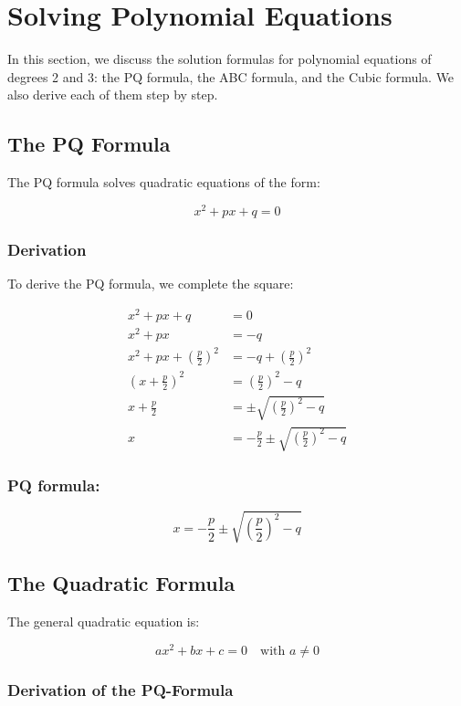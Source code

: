 \newpage
\section{Solving Polynomial Equations}

In this section, we discuss the solution formulas for polynomial equations of degrees 2 and 3: the PQ formula, the ABC formula, and the Cubic formula. We also derive each of them step by step.

\subsection{The PQ Formula}

The PQ formula solves quadratic equations of the form:

\[
x^2 + px + q = 0
\]

\subsubsection{Derivation}

To derive the PQ formula, we complete the square:

\begin{align*}
x^2 + px + q &= 0 \\
x^2 + px &= -q \\
x^2 + px + {\left(\frac{p}{2}\right)}^2 &= -q + {\left(\frac{p}{2}\right)}^2 \\
{\left(x + \frac{p}{2}\right)}^2 &= {\left(\frac{p}{2}\right)}^2 - q \\
x + \frac{p}{2} &= \pm \sqrt{{\left(\frac{p}{2}\right)}^2 - q} \\
x &= -\frac{p}{2} \pm \sqrt{{\left(\frac{p}{2}\right)}^2 - q}
\end{align*}

\subsubsection{PQ formula:}

\[
x = -\frac{p}{2} \pm \sqrt{{\left(\frac{p}{2}\right)}^2 - q}
\]

\subsection{The Quadratic Formula}

The general quadratic equation is:

\[
ax^2 + bx + c = 0
\quad\text{with } a \ne 0
\]

\subsubsection{Derivation of the PQ-Formula}

